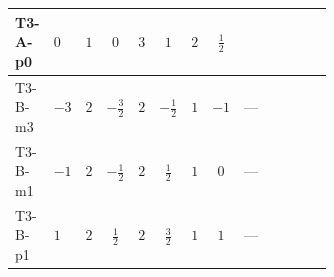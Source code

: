 \documentclass[8pt]{article}
\begin{document}
\begin{landscape}
\begin{longtable}{@{}llcccccc >{\raggedright\arraybackslash}p{0.21\linewidth} >{\raggedright\arraybackslash}p{0.21\linewidth} >{\raggedright\arraybackslash}p{0.21\linewidth}@{}}
\midrule
T3-A-p0 & $0$ & $1$ & $0$ & $3$ & $1$ & $2$ & $\frac{1}{2}$ & \scriptsize\adjustbox{max width=\linewidth}{$\begin{gathered} {\lambda_{12}^{(1)}} (4 T_{\nu}^{(1)}+2 T_{\nu}^{(2)}+4 {\lambda_{S_2}^{(A)}})\end{gathered}$} & \scriptsize\adjustbox{max width=\linewidth}{$\begin{gathered} -4 \operatorname{Tr}\!\left({y_1}\,\left({y_1}\right)^{\dagger}\,{y_2}\,\left({y_2}\right)^{\dagger}\right)\end{gathered}$} & \scriptsize\adjustbox{max width=\linewidth}{$\begin{gathered} +4 {\lambda_5} \left({\lambda_5}\right)^{*}\end{gathered}$} \\
\midrule
T3-B-m3 & $-3$ & $2$ & $-\frac{3}{2}$ & $2$ & $-\frac{1}{2}$ & $1$ & $-1$ & --- & \scriptsize\adjustbox{max width=\linewidth}{$\begin{gathered} -2 \operatorname{Tr}\!\left({y_1}\,\left({y_1}\right)^{\dagger}\,{y_2}\,\left({y_2}\right)^{\dagger}\right)\end{gathered}$} & \scriptsize\adjustbox{max width=\linewidth}{$\begin{gathered} +3 {\lambda_5} \left({\lambda_5}\right)^{*}\end{gathered}$} \\
\midrule
T3-B-m1 & $-1$ & $2$ & $-\frac{1}{2}$ & $2$ & $\frac{1}{2}$ & $1$ & $0$ & --- & \scriptsize\adjustbox{max width=\linewidth}{$\begin{gathered} -2 \operatorname{Tr}\!\left({y_1}\,\left({y_1}\right)^{\dagger}\,{y_2}\,\left({y_2}\right)^{\dagger}\right)\end{gathered}$} & \scriptsize\adjustbox{max width=\linewidth}{$\begin{gathered} +3 {\lambda_5} \left({\lambda_5}\right)^{*}\end{gathered}$} \\
\midrule
T3-B-p1 & $1$ & $2$ & $\frac{1}{2}$ & $2$ & $\frac{3}{2}$ & $1$ & $1$ & --- & \scriptsize\adjustbox{max width=\linewidth}{$\begin{gathered} -2 \operatorname{Tr}\!\left({y_1}\,\left({y_1}\right)^{\dagger}\,{y_2}\,\left({y_2}\right)^{\dagger}\right)\end{gathered}$} & \scriptsize\adjustbox{max width=\linewidth}{$\begin{gathered} +3 {\lambda_5} \left({\lambda_5}\right)^{*}\end{gathered}$} \\

\end{longtable}
\end{landscape}
\end{document}
